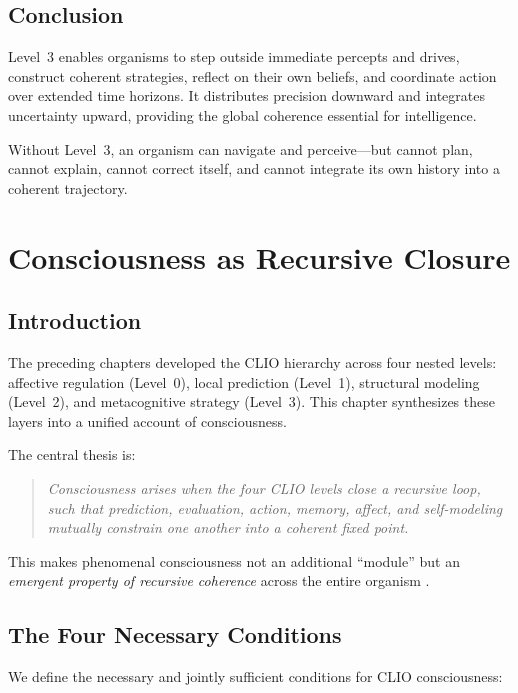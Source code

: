 \documentclass[12pt,oneside]{book}
\theoremstyle{plain}
\theoremstyle{definition}
\let\citep\parencite
\begin{document}
\section{Conclusion}

Level~3 enables organisms to step outside immediate percepts and drives,
construct coherent strategies, reflect on their own beliefs, and coordinate
action over extended time horizons.
It distributes precision downward and integrates uncertainty upward,
providing the global coherence essential for intelligence.

Without Level~3, an organism can navigate and perceive—but cannot plan,
cannot explain, cannot correct itself, and cannot integrate its own history
into a coherent trajectory.

\chapter{Consciousness as Recursive Closure}

\section{Introduction}

The preceding chapters developed the CLIO hierarchy across four nested levels:
affective regulation (Level~0), local prediction (Level~1), structural modeling
(Level~2), and metacognitive strategy (Level~3).
This chapter synthesizes these layers into a unified account of consciousness.

The central thesis is:

\begin{quote}
\emph{Consciousness arises when the four CLIO levels close a recursive loop,
such that prediction, evaluation, action, memory, affect, and self-modeling
mutually constrain one another into a coherent fixed point.}
\end{quote}

This makes phenomenal consciousness not an additional ``module'' but an
\emph{emergent property of recursive coherence} across the entire organism
\citep{solms2021hidden,friston2017active,dehaene2014consciousness}.

\section{The Four Necessary Conditions}

We define the necessary and jointly sufficient conditions for CLIO
consciousness:
\end{document}
